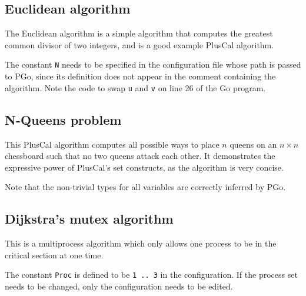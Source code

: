 \subsection{Euclidean algorithm}
The Euclidean algorithm is a simple algorithm that computes the greatest common divisor of two integers, and is a good example PlusCal algorithm.



%

The constant \lstinline[language=pcal]|N| needs to be specified in the configuration file whose path is passed to PGo, since its definition does not appear in the comment containing the algorithm. Note the code to swap \lstinline[language=pcal]|u| and \lstinline[language=pcal]|v| on line 26 of the Go program.

\subsection{N-Queens problem}
This PlusCal algorithm computes all possible ways to place $n$ queens on an $n \times n$ chessboard such that no two queens attack each other. It demonstrates the expressive power of PlusCal's set constructs, as the algorithm is very concise.



%

Note that the non-trivial types for all variables are correctly inferred by PGo.

\subsection{Dijkstra's mutex algorithm}
This is a multiprocess algorithm which only allows one process to be in the critical section at one time.



%

The constant \lstinline[language=pcal]|Proc| is defined to be \lstinline[language=pcal]|1 .. 3| in the configuration. If the process set needs to be changed, only the configuration needs to be edited.
